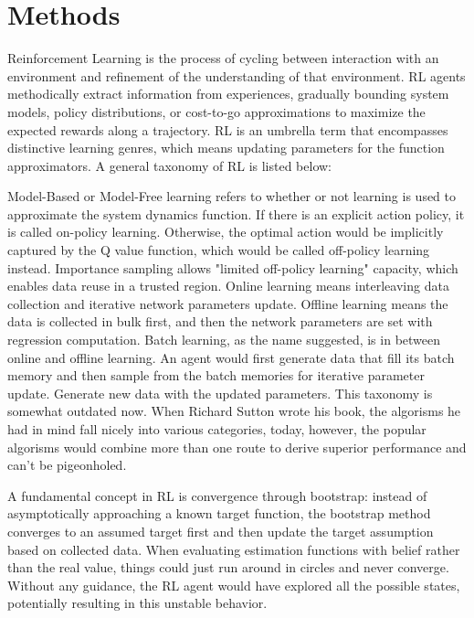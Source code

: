 \documentclass[AMS,STIX1COL]{WileyNJD-v2}
\begin{document}
\section{Methods}

Reinforcement Learning is the process of cycling between interaction with an environment and refinement of the understanding of that environment. RL agents methodically extract information from experiences, gradually bounding system models, policy distributions, or cost-to-go approximations to maximize the expected rewards along a trajectory. RL is an umbrella term that encompasses distinctive learning genres, which means updating parameters for the function approximators. A general taxonomy of RL is listed below:

Model-Based or Model-Free learning refers to whether or not learning is used to approximate the system dynamics function. If there is an explicit action policy, it is called on-policy learning. Otherwise, the optimal action would be implicitly captured by the Q value function, which would be called off-policy learning instead. Importance sampling allows "limited off-policy learning" capacity, which enables data reuse in a trusted region. Online learning means interleaving data collection and iterative network parameters update. Offline learning means the data is collected in bulk first, and then the network parameters are set with regression computation. Batch learning, as the name suggested, is in between online and offline learning. An agent would first generate data that fill its batch memory and then sample from the batch memories for iterative parameter update. Generate new data with the updated parameters. This taxonomy is somewhat outdated now. When Richard Sutton wrote his book\citet{Sutton1998IntroductionTR}, the algorisms he had in mind fall nicely into various categories, today, however, the popular algorisms would combine more than one route to derive superior performance and can't be pigeonholed.

A fundamental concept in RL is convergence through bootstrap: instead of asymptotically approaching a known target function, the bootstrap method converges to an assumed target first and then update the target assumption based on collected data. When evaluating estimation functions with belief rather than the real value, things could just run around in circles and never converge. Without any guidance, the RL agent would have explored all the possible states, potentially resulting in this unstable behavior. 
\end{document}

